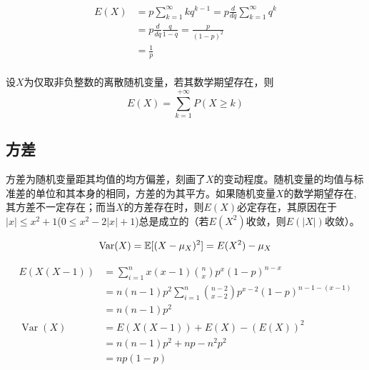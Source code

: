 \begin{example}[微分法求解几何分布均值]\label{ex:geometric_dist_mean}
    \begin{align*}
        E(X) & =p\sum_{k=1}^{\infty}k q^{k-1}=p\frac{d}{d q}\sum_{k=1}^{\infty} q^{k} \\
             & =p\frac{d}{d q} \frac{q}{1-q} =\frac{p}{(1-p)^{2}}                     \\
             & =\frac{1}{p}                                                           \\
    \end{align*}
\end{example}

\begin{proposition}\label{prop:mean_of_non-negative_discrete_varible}
    设$X$为仅取非负整数的离散随机变量，若其数学期望存在，则
    \[ E(X) = \sum_{k=1}^{+\infty}P(X \ge k) \]
\end{proposition}

\subsection{方差}

方差为随机变量距其均值的均方偏差，刻画了$X$的变动程度。随机变量的均值与标准差的单位和其本身的相同，方差的为其平方。如果随机变量$X$的数学期望存在, 其方差不一定存在；而当$X$的方差存在时，则$E(X)$必定存在，其原因在于$|x| \le x^2+1$($0 \le x^2-2|x|+1$)总是成立的（若$E(X^2)$收敛，则$E(|X|)$收敛）。

\begin{proposition}
    \[ \operatorname{Var}(X)=\mathbb{E}[(X-\mu_X)^2]=E(X^2)-\mu_X \]
\end{proposition}

\begin{example}[凑一法求解二项分布的方差]\label{ex:binom_dist_var}
    \begin{align*}
        E(X(X-1))             & =\sum_{i=1}^n x(x-1) \binom{n}{x} p^x(1-p)^{n-x}                   \\
                              & = n(n-1)p^2 \sum_{i=1}^n \binom{n-2}{x-2} p^{x-2}(1-p)^{n-1-(x-1)} \\
                              & =n(n-1)p^2                                                         \\
        \operatorname{Var}(X) & =  E(X(X-1)) + E(X) -(E(X))^2                                      \\
                              & = n(n-1)p^2 + np -n^2 p^2                                          \\
                              & =np(1-p)
    \end{align*}
\end{example}


